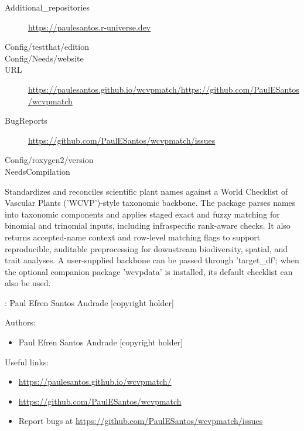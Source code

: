 \documentclass[a4paper]{book}
\begin{document}
\begin{description}
\item[Additional\_repositories]\AsIs{}\url{https://paulesantos.r-universe.dev}\AsIs{}
\item[Config/testthat/edition]
\item[Config/Needs/website]
\item[URL]\AsIs{}\url{https://paulesantos.github.io/wcvpmatch/}\AsIs{,
}\url{https://github.com/PaulESantos/wcvpmatch}\AsIs{}
\item[BugReports]\AsIs{}\url{https://github.com/PaulESantos/wcvpmatch/issues}\AsIs{}
\item[Config/roxygen2/version]
\item[NeedsCompilation]
\end{description}
%
\begin{Description}
Standardizes and reconciles scientific plant names against a World Checklist of Vascular Plants ('WCVP')-style taxonomic backbone. The package parses names into taxonomic components and applies staged exact and fuzzy matching for binomial and trinomial inputs, including infraspecific rank-aware checks. It also returns accepted-name context and row-level matching flags to support reproducible, auditable preprocessing for downstream biodiversity, spatial, and trait analyses. A user-supplied backbone can be passed through 'target\_df'; when the optional companion package 'wcvpdata' is installed, its default checklist can also be used.
\end{Description}
%
\begin{Author}
: Paul Efren Santos Andrade  [copyright holder]

Authors:
\begin{itemize}

\item{} Paul Efren Santos Andrade  [copyright holder]

\end{itemize}


\end{Author}
%
\begin{SeeAlso}
Useful links:
\begin{itemize}

\item{} \url{https://paulesantos.github.io/wcvpmatch/}
\item{} \url{https://github.com/PaulESantos/wcvpmatch}
\item{} Report bugs at \url{https://github.com/PaulESantos/wcvpmatch/issues}

\end{itemize}


\end{SeeAlso}
\end{document}
